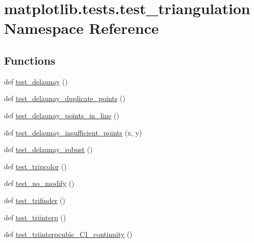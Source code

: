 \hypertarget{namespacematplotlib_1_1tests_1_1test__triangulation}{}\section{matplotlib.\+tests.\+test\+\_\+triangulation Namespace Reference}
\label{namespacematplotlib_1_1tests_1_1test__triangulation}
\subsection*{Functions}
\begin{DoxyCompactItemize}
\item 
def \hyperlink{namespacematplotlib_1_1tests_1_1test__triangulation_a70efd6633395fc5cc677ff279c52ac9f}{test\+\_\+delaunay} ()
\item 
def \hyperlink{namespacematplotlib_1_1tests_1_1test__triangulation_a145e78316d79055fe6cede35f8979673}{test\+\_\+delaunay\+\_\+duplicate\+\_\+points} ()
\item 
def \hyperlink{namespacematplotlib_1_1tests_1_1test__triangulation_a45931d51763b27c86a085f447f894f27}{test\+\_\+delaunay\+\_\+points\+\_\+in\+\_\+line} ()
\item 
def \hyperlink{namespacematplotlib_1_1tests_1_1test__triangulation_a774d283770113664ea1e4e02a038e1c4}{test\+\_\+delaunay\+\_\+insufficient\+\_\+points} (x, y)
\item 
def \hyperlink{namespacematplotlib_1_1tests_1_1test__triangulation_a58762f8f9c609ae0e6266301c16e060b}{test\+\_\+delaunay\+\_\+robust} ()
\item 
def \hyperlink{namespacematplotlib_1_1tests_1_1test__triangulation_ad6783dc214820c65e6491fdee013cca3}{test\+\_\+tripcolor} ()
\item 
def \hyperlink{namespacematplotlib_1_1tests_1_1test__triangulation_adcd98600658ac184d63252a79aa0bdf3}{test\+\_\+no\+\_\+modify} ()
\item 
def \hyperlink{namespacematplotlib_1_1tests_1_1test__triangulation_a4e9d5c2fdf68b835b5666b0368746463}{test\+\_\+trifinder} ()
\item 
def \hyperlink{namespacematplotlib_1_1tests_1_1test__triangulation_a3745b64604ecd35628934c23d115aa33}{test\+\_\+triinterp} ()
\item 
def \hyperlink{namespacematplotlib_1_1tests_1_1test__triangulation_a0c1586d32d5d35a515337fa7a13f0dad}{test\+\_\+triinterpcubic\+\_\+\+C1\+\_\+continuity} ()
\item 

\end{DoxyCompactItemize}
